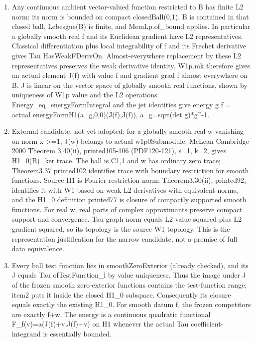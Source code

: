 \documentclass[11pt]{article}
\theoremstyle{definition}
\theoremstyle{remark}
\numberwithin{equation}{section}
\begin{document}
\begin{enumerate}
\def\labelenumi{\arabic{enumi}.}
\item
  Any continuous ambient vector-valued function restricted to B has
  finite L2 norm: its norm is bounded on compact closedBall(0,1), B is
  contained in that closed ball, Lebesgue(B) is finite, and
  MemLp.of\_bound applies. In particular a globally smooth real f and
  its Euclidean gradient have L2 representatives. Classical
  differentiation plus local integrability of f and its Frechet
  derivative gives Tau HasWeakFDerivOn. Almost-everywhere replacement by
  these L2 representatives preserves the weak derivative identity.
  W1p.mk therefore gives an actual element J(f) with value f and
  gradient grad f almost everywhere on B. J is linear on the vector
  space of globally smooth real functions, shown by uniqueness of W1p
  value and the L2 operations. Energy\_eq\_energyFormIntegral and the
  jet identities give energy g f = actual
  energyFormH1(a\_g,0,0)(J(f),J(f)), a\_g=sqrt(det g)*g\^{}-1.
\item
  External candidate, not yet adopted: for a globally smooth real w
  vanishing on norm x \textgreater=1, J(w) belongs to actual
  w1p0Submodule. McLean Cambridge 2000 Theorem 3.40(ii), printed105-106
  (PDF120-121), s=1, k=2, gives H1\_0(B)=ker trace. The ball is C1,1 and
  w has ordinary zero trace; Theorem3.37 printed102 identifies trace
  with boundary restriction for smooth functions. Source H1 is Fourier
  restriction norm; Theorem3.30(ii), printed92, identifies it with W1
  based on weak L2 derivatives with equivalent norms, and the H1\_0
  definition printed77 is closure of compactly supported smooth
  functions. For real w, real parts of complex approximants preserve
  compact support and convergence. Tau graph norm equals L2 value
  squared plus L2 gradient squared, so its topology is the source W1
  topology. This is the representation justification for the narrow
  candidate, not a premise of full data equivalence.
\item
  Every ball test function lies in smoothZeroExterior (already checked),
  and its J equals Tau ofTestFunction\_l by value uniqueness. Thus the
  image under J of the frozen smooth zero-exterior functions contains
  the test-function range; item2 puts it inside the closed H1\_0
  subspace. Consequently its closure equals exactly the existing H1\_0.
  For smooth datum f, the frozen competitors are exactly f+w. The energy
  is a continuous quadratic functional F\_f(v)=a(J(f)+v,J(f)+v) on H1
  whenever the actual Tau coefficient-integrand is essentially bounded.

\end{enumerate}
\end{document}
